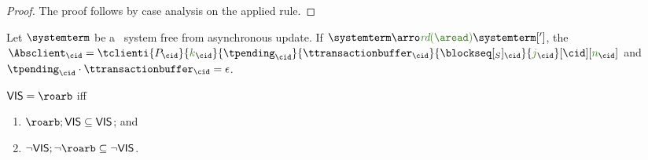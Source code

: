 \begin{proof}The proof follows by case analysis on the applied rule.
\end{proof}

\begin{corollary}\label{corollary:async-emptyqueue} Let $\systemterm$  be a \gsp\ system free from asynchronous update. If $\systemterm\arroi{\readtran{\aread}}\systemterm[']$,
the $\Absclient_{\cid}= \tclienti{\tprogram_{\cid}}{\tknown_{\cid}}{\tpending_{\cid}}{\ttransactionbuffer_{\cid}}{\tsent_{\cid}}{\treceivebuffer_{\cid}}[\cid][\trounds_{\cid}]$ and
$\tpending_{\cid}\cdot{\ttransactionbuffer_{\cid}} = \epsilon$.
\end{corollary}



%
%
%
%
%
%

\begin{lemma} $\ovis = \roarb$ iff 

\begin{enumerate}
   \item $\roarb;\ovis \subseteq \ovis$; and
   \item $\neg\ovis;\neg\roarb \subseteq \neg\ovis$.
\end{enumerate}
\end{lemma}

